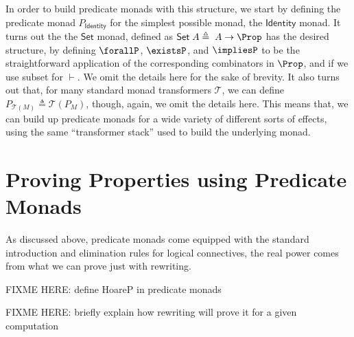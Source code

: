 \documentclass[preprint]{sigplanconf}
\begin{document}
In order to build predicate monads with this structure, we start by defining the
predicate monad $P_{\mathsf{Identity}}$ for the simplest possible monad, the
$\mathsf{Identity}$ monad. It turns out the the $\mathsf{Set}$ monad, defined as
$\mathsf{Set}\;A\triangleq\;A\to\Prop$ has the desired structure, by defining
$\forallP$, $\existsP$, and $\impliesP$ to be the straightforward application of
the corresponding combinators in $\Prop$, and if we use subset for $\vdash$.  We
omit the details here for the sake of brevity.
%
It also turns out that, for many standard monad transformers $\mathcal{T}$, we
can define $P_{\mathcal{T}(M)}\triangleq\mathcal{T}(P_M)$, though, again, we
omit the details here. This means that, we can build up predicate monads for a
wide variety of different sorts of effects, using the same ``transformer stack''
used to build the underlying monad.


\section{Proving Properties using Predicate Monads}

As discussed above, predicate monads come equipped with the standard
introduction and elimination rules for logical connectives, the real power
comes from what we can prove just with rewriting.


FIXME HERE: define HoareP in predicate monads

FIXME HERE: briefly explain how rewriting will prove it for a given computation





\end{document}
